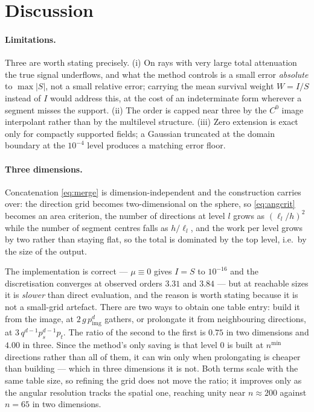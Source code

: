 \documentclass[11pt]{article}
\begin{document}
\section{Discussion}
\label{sec:discussion}

\paragraph{Limitations.}
Three are worth stating precisely. (i) On rays with very large total
attenuation the true signal underflows, and what the method controls is a small
error \emph{absolute} to $\max|S|$, not a small relative error; carrying the
mean survival weight $W=I/S$ instead of $I$ would address this, at the cost of
an indeterminate form wherever a segment misses the support. (ii) The order is
capped near three by the $C^0$ image interpolant rather than by the multilevel
structure. (iii) Zero extension is exact only for compactly supported fields;
a Gaussian truncated at the domain boundary at the $10^{-4}$ level produces a
matching error floor.

\paragraph{Three dimensions.}
Concatenation \eqref{eq:merge} is dimension-independent and the construction
carries over: the direction grid becomes two-dimensional on the sphere, so
\eqref{eq:angcrit} becomes an area criterion, the number of directions at level
$l$ grows as $(\ell_l/h)^2$ while the number of segment centres falls as
$h/\ell_l$, and the work per level grows by two rather than staying flat, so the
total is dominated by the top level, i.e.\ by the size of the output.

The implementation is correct --- $\mu\equiv0$ gives $I=S$ to $10^{-16}$ and
the discretisation converges at observed orders $3.31$ and $3.84$ --- but at
reachable sizes it is \emph{slower} than direct evaluation, and the reason is
worth stating because it is not a small-grid artefact. There are two ways to
obtain one table entry: build it from the image, at $2\,g\,p_{\mathrm{img}}^d$
gathers, or prolongate it from neighbouring directions, at
$3\,q^{d-1}p_s^{d-1}p_t$. The ratio of the second to the first is $0.75$ in two
dimensions and $4.00$ in three. Since the method's only saving is that level $0$
is built at $n^{\min}$ directions rather than all of them, it can win only when
prolongating is cheaper than building --- which in three dimensions it is not.
Both terms scale with the same table size, so refining the grid does not move
the ratio; it improves only as the angular resolution tracks the spatial one,
reaching unity near $n\approx200$ against $n=65$ in two dimensions.
\end{document}
